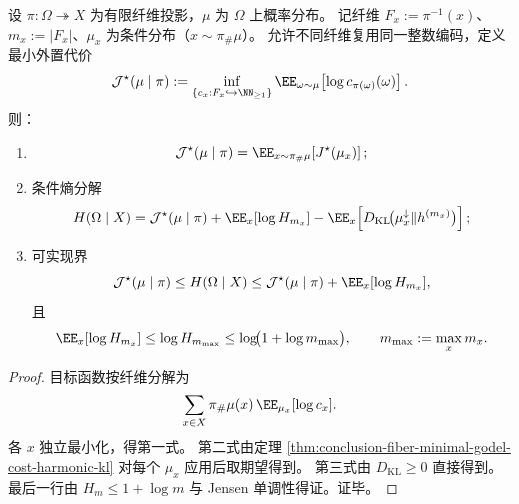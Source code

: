 \begin{corollary}[投影条件熵与最小素数寄存器账本的可实现界]\label{cor:conclusion-conditional-entropy-min-prime-register-ledger}
设 \(\pi:\Omega\twoheadrightarrow X\) 为有限纤维投影，\(\mu\) 为 \(\Omega\) 上概率分布。
记纤维 \(F_x:=\pi^{-1}(x)\)、\(m_x:=|F_x|\)、\(\mu_x\) 为条件分布（\(x\sim \pi_\#\mu\)）。
允许不同纤维复用同一整数编码，定义最小外置代价
\[
\mathcal J^\star(\mu\mid\pi):=
\inf_{\{c_x:F_x\hookrightarrow\NN_{\ge 1}\}}
\EE_{\omega\sim\mu}\!\left[\log c_{\pi(\omega)}(\omega)\right].
\]
则：
\begin{enumerate}
  \item
  \[
  \mathcal J^\star(\mu\mid\pi)=\EE_{x\sim\pi_\#\mu}\!\left[J^\star(\mu_x)\right];
  \]
  \item 条件熵分解
  \[
  H(\Omega\mid X)=
  \mathcal J^\star(\mu\mid\pi)
  +\EE_x[\log H_{m_x}]
  -\EE_x\!\left[D_{\mathrm{KL}}\!\bigl(\mu_x^\downarrow\|h^{(m_x)}\bigr)\right];
  \]
  \item 可实现界
  \[
  \mathcal J^\star(\mu\mid\pi)\le H(\Omega\mid X)\le
  \mathcal J^\star(\mu\mid\pi)+\EE_x[\log H_{m_x}],
  \]
  且
  \[
  \EE_x[\log H_{m_x}]
  \le \log H_{m_{\max}}
  \le \log\!\bigl(1+\log m_{\max}\bigr),\qquad
  m_{\max}:=\max_x m_x.
  \]
\end{enumerate}
\end{corollary}
\begin{proof}
目标函数按纤维分解为
\[
\sum_{x\in X}\pi_\#\mu(x)\,\EE_{\mu_x}[\log c_x].
\]
各 \(x\) 独立最小化，得第一式。
第二式由定理 \ref{thm:conclusion-fiber-minimal-godel-cost-harmonic-kl} 对每个 \(\mu_x\) 应用后取期望得到。
第三式由 \(D_{\mathrm{KL}}\ge 0\) 直接得到。
最后一行由 \(H_m\le 1+\log m\) 与 Jensen 单调性得证。证毕。
\end{proof}

